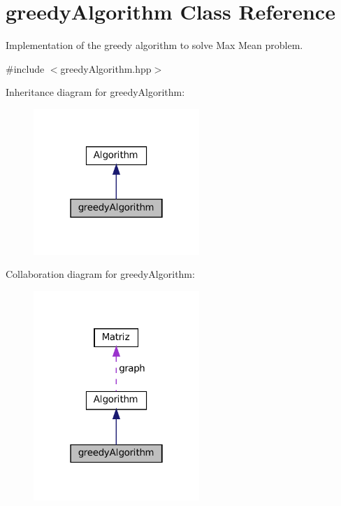 \hypertarget{classgreedyAlgorithm}{}\section{greedy\+Algorithm Class Reference}
\label{classgreedyAlgorithm}


Implementation of the greedy algorithm to solve Max Mean problem.  




{\ttfamily \#include $<$greedy\+Algorithm.\+hpp$>$}



Inheritance diagram for greedy\+Algorithm\+:
\nopagebreak
\begin{figure}[H]
\begin{center}
\leavevmode
\includegraphics[width=178pt]{classgreedyAlgorithm__inherit__graph}
\end{center}
\end{figure}


Collaboration diagram for greedy\+Algorithm\+:
\nopagebreak
\begin{figure}[H]
\begin{center}
\leavevmode
\includegraphics[width=178pt]{classgreedyAlgorithm__coll__graph}
\end{center}
\end{figure}
